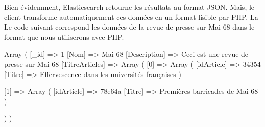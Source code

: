 \newpage
Bien évidemment, Elasticsearch retourne les résultats au format JSON. Mais, le client transforme automatiquement ces données en un format lisible par PHP. La Le code suivant correspond les données de la revue de presse sur Mai 68 dans le format que nous utiliserons avec PHP.

\begin{verbatimtab}[3]
Array
(
 [_id] => 1
 [Nom] => Mai 68
 [Description] => Ceci est une revue de presse sur Mai 68
 [TitreArticles] => Array
   (
		[0] => Array
		 (
			[idArticle] => 34354
			[Titre] => Effervescence dans les universités françaises
	   )

		[1] => Array
		 (
			[idArticle] => 78e64a
			[Titre] => Premières barricades de Mai 68
		 )

	)	
)
\end{verbatimtab}
